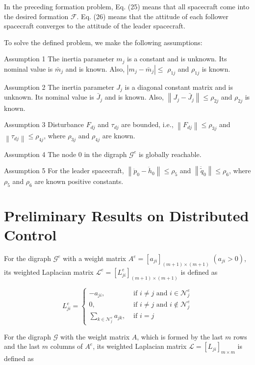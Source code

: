 \documentclass[10pt]{article}
\begin{document}
In the preceding formation problem, Eq. (25) means that all spacecraft come into the desired formation $\mathcal{F}$. Eq. (26) means that the attitude of each follower spacecraft converges to the attitude of the leader spacecraft.

To solve the defined problem, we make the following assumptions:

Assumption 1 The inertia parameter $m_{j}$ is a constant and is unknown. Its nominal value is $\bar{m}_{j}$ and is known. Also, $\left|m_{j}-\bar{m}_{j}\right| \leq$ $\rho_{1 j}$ and $\rho_{1 j}$ is known.

Assumption 2 The inertia parameter $J_{j}$ is a diagonal constant matrix and is unknown. Its nominal value is $\bar{J}_{j}$ and is known. Also, $\left\|J_{j}-\bar{J}_{j}\right\| \leq \rho_{2 j}$ and $\rho_{2 j}$ is known.

Assumption 3 Disturbance $F_{d j}$ and $\tau_{d j}$ are bounded, i.e., $\left\|F_{d j}\right\| \leq \rho_{3 j}$ and $\left\|\tau_{d j}\right\| \leq \rho_{4 j}$, where $\rho_{3 j}$ and $\rho_{4 j}$ are known.

Assumption 4 The node 0 in the digraph $\mathcal{G}^{e}$ is globally reachable.

Assumption 5 For the leader spacecraft, $\left\|\ddot{p}_{0}-\ddot{h}_{0}\right\| \leq \rho_{5}$ and $\left\|\ddot{\tilde{q}}_{0}\right\| \leq \rho_{6}$, where $\rho_{5}$ and $\rho_{6}$ are known positive constants.

\section{Preliminary Results on Distributed Control}
For the digraph $\mathcal{G}^{e}$ with a weight matrix $A^{e}=\left[a_{j i}\right]_{(m+1) \times(m+1)}$ $\left(a_{j i}>0\right)$, its weighted Laplacian matrix $\mathcal{L}^{e}=\left[L_{j i}^{e}\right]_{(m+1) \times(m+1)}$ is defined as

$$
L_{j i}^{e}= \begin{cases}-a_{j i}, & \text { if } i \neq j \text { and } i \in \mathcal{N}_{j}^{e} \\ 0, & \text { if } i \neq j \text { and } i \notin \mathcal{N}_{j}^{e} \\ \sum_{k \in \mathcal{N}_{j}^{e}} a_{j k}, & \text { if } i=j\end{cases}
$$

For the digraph $\mathcal{G}$ with the weight matrix $A$, which is formed by the last $m$ rows and the last $m$ columns of $A^{e}$, its weighted Laplacian matrix $\mathcal{L}=\left[L_{j i}\right]_{m \times m}$ is defined as
\end{document}
